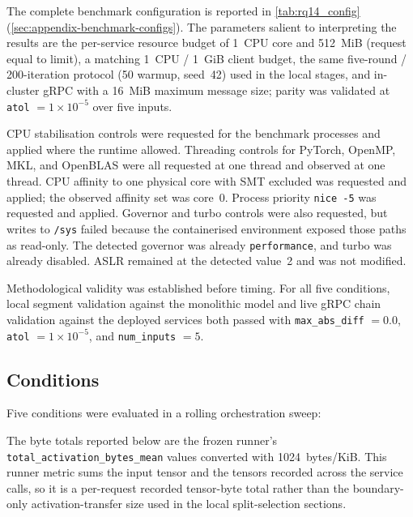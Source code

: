 The complete benchmark configuration is reported in
\cref{tab:rq14_config} (\cref{sec:appendix-benchmark-configs}). The parameters
salient to interpreting the results are the per-service resource budget of
1~CPU core and 512~MiB (request equal to limit), a matching 1~CPU / 1~GiB client
budget, the same five-round / 200-iteration protocol (50 warmup, seed~42) used in
the local stages, and in-cluster gRPC with a 16~MiB maximum message size; parity
was validated at \texttt{atol} $= 1 \times 10^{-5}$ over five inputs.

CPU stabilisation controls were requested for the benchmark processes and applied where
the runtime allowed. Threading controls for PyTorch, OpenMP, MKL, and OpenBLAS were all
requested at one thread and observed at one thread. CPU affinity to one physical core
with SMT excluded was requested and applied; the observed affinity set was core~0.
Process priority \texttt{nice~-5} was requested and applied. Governor and turbo controls
were also requested, but writes to \texttt{/sys} failed because the containerised
environment exposed those paths as read-only. The detected governor was already
\texttt{performance}, and turbo was already disabled. ASLR remained at the detected
value~2 and was not modified.

Methodological validity was established before timing. For all five conditions, local
segment validation against the monolithic model and live gRPC chain validation against
the deployed services both passed with \texttt{max\_abs\_diff} $= 0.0$,
\texttt{atol} $= 1 \times 10^{-5}$, and \texttt{num\_inputs} $= 5$.

\subsection{Conditions}

Five conditions were evaluated in a rolling orchestration sweep:

The byte totals reported below are the frozen runner's
\texttt{total\_activation\_bytes\_mean} values converted with
1024~bytes/KiB. This runner metric sums the input tensor and the tensors
recorded across the service calls, so it is a per-request recorded tensor-byte
total rather than the boundary-only activation-transfer size used in the local
split-selection sections.

